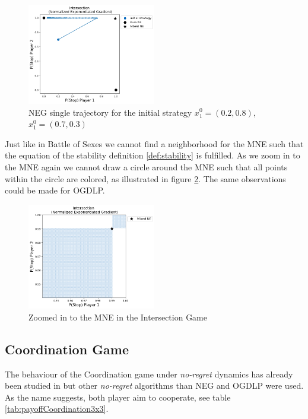 \begin{figure}[H]
    \centering
    \includegraphics[width=0.5\textwidth]{logos/Intersection5.png}
    \caption{NEG single trajectory for the initial strategy $x_{1}^{0} = (0.2,0.8)$, $x_{1}^{0} = (0.7,0.3)$}
    \label{fig:Intersection5}
\end{figure}

Just like in Battle of Sexes we cannot find a neighborhood for the MNE such that the equation of the stability definition \ref{def:stability} is fulfilled. As we zoom in to the MNE again we cannot draw a circle around the MNE such that all points within the circle are colored, as illustrated in figure \ref{fig:Intersection6}. The same observations could be made for OGDLP. 

\begin{figure}[H]
    \centering
    \includegraphics[width=0.5\textwidth]{logos/Intersection6.png}
    \caption{Zoomed in to the MNE in the Intersection Game}
    \label{fig:Intersection6}
\end{figure}


\subsection{Coordination Game}\label{subsection:coordinationGame}

The behaviour of the Coordination game under \textit{no-regret} dynamics has already been studied in \cite{jafari} but other \textit{no-regret} algorithms than NEG and OGDLP were used. As the name suggests, both player aim to cooperate, see table \ref{tab:payoffCoordination3x3}. 

